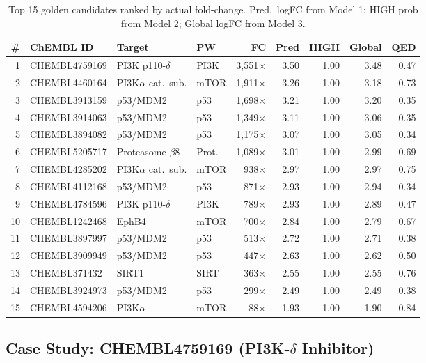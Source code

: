 \documentclass[11pt,a4paper]{article}
\begin{document}
\begin{table}[H]
\centering
\caption{Top 15 golden candidates ranked by actual fold-change.
Pred.\ logFC from Model 1; HIGH prob from Model 2; Global logFC from Model 3.}
\label{tab:golden_top}
\footnotesize
\begin{tabular}{@{}rlllrrrrr@{}}
\toprule
\textbf{\#} & \textbf{ChEMBL ID} & \textbf{Target} & \textbf{PW} &
\textbf{FC} & \textbf{Pred} & \textbf{HIGH} & \textbf{Global} & \textbf{QED} \\
\midrule
 1 & CHEMBL4759169 & PI3K p110-$\delta$ & PI3K & 3{,}551$\times$ & 3.50 & 1.00 & 3.48 & 0.47 \\
 2 & CHEMBL4460164 & PI3K$\alpha$ cat.\ sub. & mTOR & 1{,}911$\times$ & 3.26 & 1.00 & 3.18 & 0.73 \\
 3 & CHEMBL3913159 & p53/MDM2 & p53 & 1{,}698$\times$ & 3.21 & 1.00 & 3.20 & 0.35 \\
 4 & CHEMBL3914063 & p53/MDM2 & p53 & 1{,}349$\times$ & 3.11 & 1.00 & 3.06 & 0.35 \\
 5 & CHEMBL3894082 & p53/MDM2 & p53 & 1{,}175$\times$ & 3.07 & 1.00 & 3.05 & 0.34 \\
 6 & CHEMBL5205717 & Proteasome $\beta$8 & Prot. & 1{,}089$\times$ & 3.01 & 1.00 & 2.99 & 0.69 \\
 7 & CHEMBL4285202 & PI3K$\alpha$ cat.\ sub. & mTOR & 938$\times$ & 2.97 & 1.00 & 2.97 & 0.75 \\
 8 & CHEMBL4112168 & p53/MDM2 & p53 & 871$\times$ & 2.93 & 1.00 & 2.94 & 0.34 \\
 9 & CHEMBL4784596 & PI3K p110-$\delta$ & PI3K & 789$\times$ & 2.93 & 1.00 & 2.89 & 0.47 \\
10 & CHEMBL1242468 & EphB4 & mTOR & 700$\times$ & 2.84 & 1.00 & 2.79 & 0.67 \\
11 & CHEMBL3897997 & p53/MDM2 & p53 & 513$\times$ & 2.72 & 1.00 & 2.71 & 0.38 \\
12 & CHEMBL3909949 & p53/MDM2 & p53 & 447$\times$ & 2.63 & 1.00 & 2.62 & 0.50 \\
13 & CHEMBL371432  & SIRT1 & SIRT & 363$\times$ & 2.55 & 1.00 & 2.55 & 0.76 \\
14 & CHEMBL3924973 & p53/MDM2 & p53 & 299$\times$ & 2.49 & 1.00 & 2.49 & 0.38 \\
15 & CHEMBL4594206 & PI3K$\alpha$ & mTOR & 88$\times$ & 1.93 & 1.00 & 1.90 & 0.84 \\
\bottomrule
\end{tabular}
\end{table}

\subsection{Case Study: CHEMBL4759169 (PI3K-$\delta$ Inhibitor)}
\end{document}
